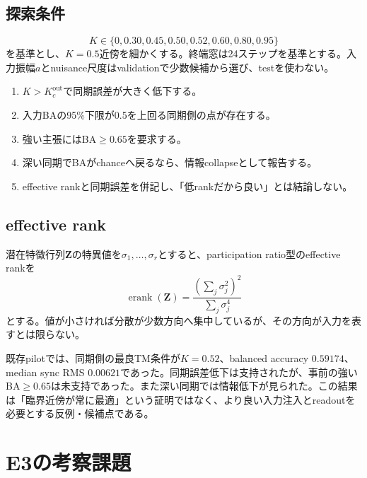 \documentclass[a4paper,11pt,oneside,openany]{ltjsbook}
\newcommand{\effrank}{\ensuremath{\operatorname{erank}}}
\newcommand{\mat}[1]{\bm{#1}}
\begin{document}
\subsection{探索条件}

\begin{equation}
  K\in\{0,0.30,0.45,0.50,0.52,0.60,0.80,0.95\}
  \label{eq:e3c_k_grid}
\end{equation}
を基準とし、\(K=0.5\)近傍を細かくする。終端窓は24ステップを基準とする。入力振幅\(a\)とnuisance尺度はvalidationで少数候補から選び、testを使わない。

\begin{gatebox}
\begin{enumerate}
  \item \(K>K_c^{\mathrm{out}}\)で同期誤差が大きく低下する。
  \item 入力BAの95\%下限が0.5を上回る同期側の点が存在する。
  \item 強い主張にはBA\(\ge0.65\)を要求する。
  \item 深い同期でBAがchanceへ戻るなら、情報collapseとして報告する。
  \item effective rankと同期誤差を併記し、「低rankだから良い」とは結論しない。
\end{enumerate}
\end{gatebox}

\subsection{effective rank}

潜在特徴行列\(\mat Z\)の特異値を\(\sigma_1,\dots,\sigma_r\)とすると、participation ratio型のeffective rankを
\begin{equation}
  \effrank{}(\mat Z)
  =\frac{\left(\sum_j\sigma_j^2\right)^2}
  {\sum_j\sigma_j^4}
  \label{eq:effective_rank}
\end{equation}
とする。値が小さければ分散が少数方向へ集中しているが、その方向が入力を表すとは限らない。

\begin{reportbox}
既存pilotでは、同期側の最良TM条件が\(K=0.52\)、balanced accuracy \(0.59174\)、median sync RMS \(0.00621\)であった。同期誤差低下は支持されたが、事前の強いBA\(\ge0.65\)は未支持であった。また深い同期では情報低下が見られた。この結果は「臨界近傍が常に最適」という証明ではなく、より良い入力注入とreadoutを必要とする反例・候補点である。
\end{reportbox}

\section{E3の考察課題}
\end{document}
